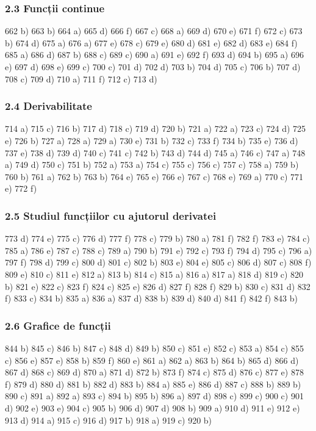 \documentclass[11pt]{article}
\begin{document}
\subsubsection*{2.3 Funcții continue}
662 b) 663 b) 664 a) 665 d) 666 f) 667 c) 668 a) 669 d) 670 e) 671 f) 672 c) 673 b) 674 d) 675 a) 676 a) 677 e) 678 c) 679 e) 680 d) 681 e) 682 d) 683 e) 684 f) 685 a) 686 d) 687 b) 688 c) 689 c) 690 a) 691 e) 692 f) 693 d) 694 b) 695 a) 696 e) 697 d) 698 e) 699 c) 700 c) 701 d) 702 d) 703 b) 704 d) 705 c) 706 b) 707 d) 708 c) 709 d) 710 a) 711 f) 712 c) 713 d)

\subsubsection*{2.4 Derivabilitate}
714 a) 715 c) 716 b) 717 d) 718 c) 719 d) 720 b) 721 a) 722 a) 723 c) 724 d) 725 e) 726 b) 727 a) 728 a) 729 a) 730 e) 731 b) 732 c) 733 f) 734 b) 735 e) 736 d) 737 e) 738 d) 739 d) 740 c) 741 c) 742 b) 743 d) 744 d) 745 a) 746 c) 747 a) 748 a) 749 d) 750 c) 751 b) 752 a) 753 a) 754 c) 755 c) 756 c) 757 c) 758 a) 759 b) 760 b) 761 a) 762 b) 763 b) 764 e) 765 e) 766 e) 767 c) 768 e) 769 a) 770 c) 771 e) 772 f)

\subsubsection*{2.5 Studiul funcțiilor cu ajutorul derivatei}
773 d) 774 e) 775 c) 776 d) 777 f) 778 c) 779 b) 780 a) 781 f) 782 f) 783 e) 784 c) 785 a) 786 e) 787 c) 788 c) 789 a) 790 b) 791 e) 792 c) 793 f) 794 d) 795 c) 796 a) 797 f) 798 d) 799 c) 800 d) 801 c) 802 b) 803 e) 804 e) 805 c) 806 d) 807 c) 808 f) 809 e) 810 c) 811 e) 812 a) 813 b) 814 c) 815 a) 816 a) 817 a) 818 d) 819 c) 820 b) 821 e) 822 c) 823 f) 824 c) 825 e) 826 d) 827 f) 828 f) 829 b) 830 c) 831 d) 832 f) 833 c) 834 b) 835 a) 836 a) 837 d) 838 b) 839 d) 840 d) 841 f) 842 f) 843 b)

\subsubsection*{2.6 Grafice de funcții}
844 b) 845 c) 846 b) 847 c) 848 d) 849 b) 850 c) 851 e) 852 c) 853 a) 854 c) 855 c) 856 e) 857 e) 858 b) 859 f) 860 e) 861 a) 862 a) 863 b) 864 b) 865 d) 866 d) 867 d) 868 c) 869 d) 870 a) 871 d) 872 b) 873 f) 874 c) 875 d) 876 c) 877 e) 878 f) 879 d) 880 d) 881 b) 882 d) 883 b) 884 a) 885 e) 886 d) 887 c) 888 b) 889 b) 890 c) 891 a) 892 a) 893 c) 894 b) 895 b) 896 a) 897 d) 898 c) 899 c) 900 c) 901 d) 902 e) 903 e) 904 c) 905 b) 906 d) 907 d) 908 b) 909 a) 910 d) 911 e) 912 e) 913 d) 914 a) 915 c) 916 d) 917 b) 918 a) 919 c) 920 b)
\end{document}
